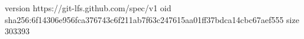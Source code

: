 version https://git-lfs.github.com/spec/v1
oid sha256:6f14306e956fca376743c6f211ab7f63c247615aa01ff37bdca14cbc67aef555
size 303393

